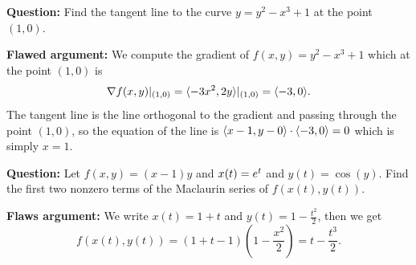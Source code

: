 \documentclass{discussion}
\begin{document}
\begin{question}
    \vspace{10pt}

    \begin{mdframed}
        \textbf{Question:} Find the tangent line to the curve \(y = y^2 - x^3 + 1\) at the point \((1, 0)\).

        \vspace{10pt}
        \noindent
        \textbf{Flawed argument:} We compute the gradient of \(f(x, y) = y^2 - x^3 + 1\) which at the point \((1, 0)\) is
        \begin{equation*}
            \nabla f(x, y) |_{(1, 0)} = \langle-3x^2, 2y\rangle|_{(1,0)} = \langle-3, 0\rangle.
        \end{equation*}
        The tangent line is the line orthogonal to the gradient and passing through the point \((1, 0)\), so the equation of the line is \(\langle x - 1, y - 0\rangle \cdot \langle-3, 0\rangle = 0\) which is simply \(x = 1\).
    \end{mdframed}

    \vspace{10pt}

    \begin{mdframed}
        \textbf{Question:} Let \(f(x, y) = (x - 1)y\) and \(x(t) = e^{t}\) and \(y(t) = \cos(y)\).
        Find the first two nonzero terms of the Maclaurin series of \(f(x(t), y(t))\).

        \vspace{10pt}
        \noindent
        \textbf{Flaws argument:} We write \(x(t) = 1 + t\) and \(y(t) = 1 - \frac{t^2}{2}\), then we get
        \begin{equation*}
            f(x(t), y(t)) = (1 + t - 1)\left(1 - \frac{x^2}{2}\right) = t - \frac{t^3}{2}.
        \end{equation*}
    \end{mdframed}
\end{question}


\end{document}
